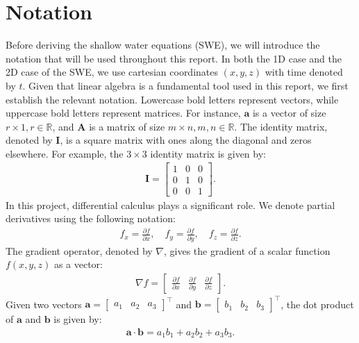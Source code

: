 \section{Notation}
Before deriving the shallow water equations (SWE), we will introduce the notation that will be used throughout this report.
In both the 1D case and the 2D case of the SWE, we use cartesian coordinates $(x, y, z)$ with time denoted by $t$.
Given that linear algebra is a fundamental tool used in this report, we first establish the relevant notation.
Lowercase bold letters represent vectors, while uppercase bold letters represent matrices.
For instance, $\mathbf{a}$ is a vector of size $r \times 1, r \in \mathbb{R}$, and $\mathbf{A}$ is a matrix of size $m \times n, m,n \in \mathbb{R}$.
The identity matrix, denoted by $\mathbf{I}$, is a square matrix with ones along the diagonal and zeros elsewhere.
For example, the $3 \times 3$ identity matrix is given by:
\begin{align*}
    \mathbf{I} = \begin{bmatrix}
        1 & 0 & 0 \\
        0 & 1 & 0 \\
        0 & 0 & 1
    \end{bmatrix}.
\end{align*}
In this project, differential calculus plays a significant role.
We denote partial derivatives using the following notation:
\begin{align}\label{eq:notation_partial_derivatives}
   f_x =  \frac{\partial f}{\partial x}, \quad f_y = \frac{\partial f}{\partial y}, \quad f_z = \frac{\partial f}{\partial z}.
\end{align}
The gradient operator, denoted by $\nabla$, gives the gradient of a scalar function $f(x,y,z)$ as a vector:
\begin{align*}
    \nabla f = \begin{bmatrix}
        \frac{\partial f}{\partial x} &
        \frac{\partial f}{\partial y} &
        \frac{\partial f}{\partial z}
    \end{bmatrix}.
\end{align*}
Given two vectors $\mathbf{a} = \begin{bmatrix}
    a_1 & a_2 & a_3
\end{bmatrix}^\top $ and $\mathbf{b} = \begin{bmatrix}
    b_1 & b_2 & b_3
\end{bmatrix}^\top$, the dot product of $\mathbf{a}$ and $\mathbf{b}$ is given by:
\begin{align*}
    \mathbf{a} \cdot \mathbf{b} = a_1 b_1 + a_2 b_2 + a_3 b_3.
\end{align*}
